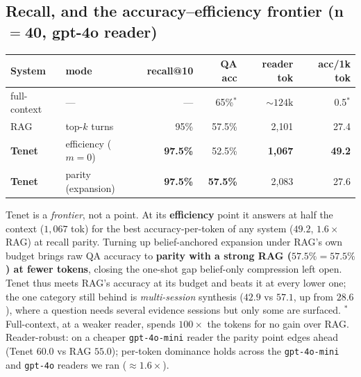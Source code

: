 \documentclass[11pt]{article}
\begin{document}
\subsection{Recall, and the accuracy--efficiency frontier (n$=$40, gpt-4o reader)}
\label{sec:frontier}
\begin{center}\small
\begin{tabular}{llrrrr}
\toprule
System & mode & recall@10 & QA acc & reader tok & \textbf{acc/1k tok} \\
\midrule
full-context & --- & --- & 65\%$^{*}$ & ${\sim}124\text{k}$ & 0.5$^{*}$ \\
RAG          & top-$k$ turns & 95\% & 57.5\% & 2{,}101 & 27.4 \\
\textbf{Tenet} & efficiency ($m{=}0$) & \textbf{97.5\%} & 52.5\% & \textbf{1{,}067} & \textbf{49.2} \\
\textbf{Tenet} & parity (expansion) & \textbf{97.5\%} & \textbf{57.5\%} & 2{,}083 & 27.6 \\
\bottomrule
\end{tabular}
\end{center}
Tenet is a \emph{frontier}, not a point. At its \textbf{efficiency} point it answers at half
the context ($1{,}067$ tok) for the best accuracy-per-token of any system ($49.2$, $1.6\times$
RAG) at recall parity. Turning up belief-anchored expansion under RAG's own budget brings raw
QA accuracy to \textbf{parity with a strong RAG ($57.5\%{=}57.5\%$) at fewer tokens}, closing
the one-shot gap belief-only compression left open. Tenet thus meets RAG's accuracy at its
budget and beats it at every lower one; the one category still behind is \emph{multi-session}
synthesis ($42.9$ vs $57.1$, up from $28.6$), where a question needs several evidence sessions
but only some are surfaced. $^{*}$Full-context, at a weaker reader, spends $100\times$ the
tokens for no gain over RAG. Reader-robust: on a cheaper \texttt{gpt-4o-mini} reader the parity
point edges ahead (Tenet $60.0$ vs RAG $55.0$); per-token dominance holds across the
\texttt{gpt-4o-mini} and \texttt{gpt-4o} readers we ran ($\approx$$1.6\times$).
\end{document}
